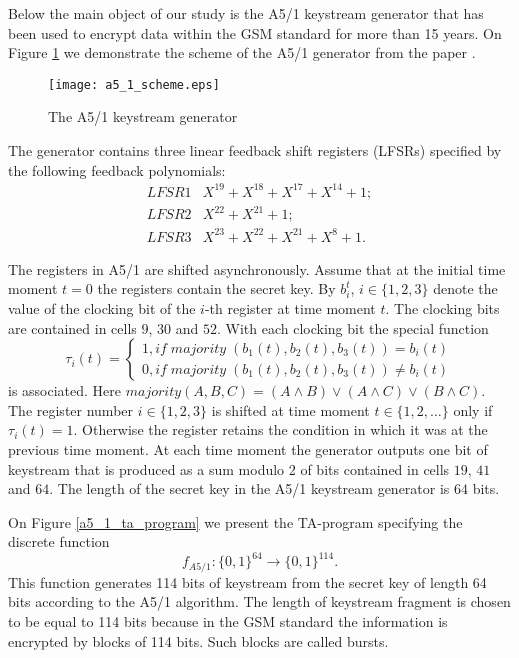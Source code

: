 \documentclass[runningheads,a4paper]{llncs}
\begin{document}
Below the main object of our study is the A5/1 keystream generator that has been used to encrypt data within the GSM standard for more than 15 years.
On Figure \ref{a5_1_scheme} we demonstrate the scheme of the A5/1 generator from the paper \cite{DBLP:conf/fse/BiryukovSW00}. 

\begin{figure}[ht]
	\centering
		\texttt{[image: a5\_1\_scheme.eps]}
	\caption{The A5/1 keystream generator}
	\label{a5_1_scheme}
\end{figure}

The generator contains three linear feedback shift registers (LFSRs) specified by the following feedback polynomials:
\begin{equation*}
\begin{array}{ll}
LFSR1 & X^{19}+X^{18}+X^{17}+X^{14}+1;\\
LFSR2 & X^{22}+X^{21}+1;\\
LFSR3 & X^{23}+X^{22}+X^{21}+X^8+1.
\end{array}
\end{equation*}

The registers in A5/1 are shifted asynchronously. Assume that at the initial time moment $t=0$ the registers contain the secret key. By $b_i^t$, $i\in\{1,2,3\}$ denote the value of the clocking bit of the $i$-th register at time moment $t$. The clocking bits are contained in cells $9$, $30$ and $52$. With each clocking bit the special function
\begin{equation*}
\tau_i(t)=\left\{
\begin{array}{l}
1, if\;majority\;\left(b_1(t),b_2(t),b_3(t)\right)=b_i(t)\\
0, if\;majority\;\left(b_1(t),b_2(t),b_3(t)\right)\neq b_i(t)
\end{array}
\right.
\end{equation*}
is associated. Here $majority\left(A,B,C\right)=(A\wedge B)\vee (A\wedge C)\vee (B\wedge C)$. The register number $i\in\{1,2,3\}$ is shifted at time moment $t\in\{1,2,\ldots\}$ only if $\tau_i(t)=1$. Otherwise the register retains the condition in which it was at the previous time moment. At each time moment the generator outputs one bit of keystream that is produced as a sum modulo 2 of bits contained in cells $19$, $41$ and $64$. The length of the secret key in the A5/1 keystream generator is $64$ bits.

On Figure \ref{a5_1_ta_program} we present the TA-program specifying the discrete function
\begin{equation}
\label{f3}
f_{A5/1}:\{0,1\}^{64}\rightarrow\{0,1\}^{114}.
\end{equation}
This function generates 114 bits of keystream from the secret key of length 64 bits according to the A5/1 algorithm. The length of keystream fragment is chosen to be equal to 114 bits because in the GSM standard the information is encrypted by blocks of 114 bits. Such blocks are called bursts. 
\end{document}
